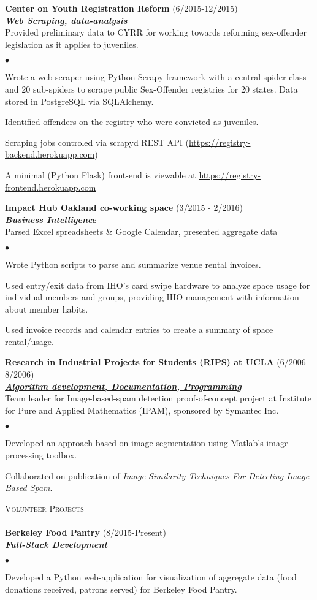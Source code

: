 \documentclass{article}
\newcommand{\lineunder}{\vspace*{-8pt} \\ \hspace*{-18pt} \hrulefill \\}
\newcommand{\header}[1]{{\hspace*{-15pt}\vspace*{6pt} \textsc{#1}} \vspace*{-6pt} \lineunder}
\newcommand{\employer}[3]{{ \textbf{#1} (#2)\\ \underline{\textbf{\emph{#3}}}\\  }}
\newenvironment{achievements}{\begin{list}{$\bullet$}{\topsep 0pt \itemsep -2pt}}{\vspace*{4pt}\end{list}}
\begin{document}
\employer{Center on Youth Registration Reform}{6/2015-12/2015}{Web Scraping, data-analysis}
 Provided preliminary data to CYRR for working towards reforming sex-offender legislation as it applies to juveniles.
\begin{achievements}
\item Wrote a web-scraper using Python Scrapy framework with a central spider class and 20 sub-spiders to scrape public Sex-Offender registries for 20 states.  Data stored in PostgreSQL via SQLAlchemy.
\item Identified offenders on the registry who were convicted as juveniles.
\item Scraping jobs controled via scrapyd REST API (\url{https://registry-backend.herokuapp.com}) 
\item A minimal (Python Flask) front-end is viewable at \url{https://registry-frontend.herokuapp.com}
\end{achievements}


\employer{Impact Hub Oakland co-working space}{3/2015 - 2/2016}{Business Intelligence}
Parsed Excel spreadsheets \& Google Calendar, presented aggregate data
\begin{achievements}
\item Wrote Python scripts to parse and summarize venue rental invoices.
\item Used entry/exit data from IHO's card swipe hardware to analyze space usage for individual members and groups, providing IHO management with information about member habits.
\item Used invoice records and calendar entries to create a summary of space rental/usage.
\end{achievements}



\employer{Research in Industrial Projects for Students (RIPS) at UCLA}{6/2006-8/2006}{Algorithm development, Documentation, Programming}
Team leader for Image-based-spam detection proof-of-concept project at  Institute for Pure and Applied Mathematics (IPAM), sponsored by Symantec Inc.
	\begin{achievements}
	\item Developed an approach based on image segmentation using Matlab's image processing toolbox.
	\item Collaborated on publication of \emph{Image Similarity Techniques For Detecting Image-Based Spam}.
\end{achievements}

\header{Volunteer Projects}
\employer{Berkeley Food Pantry}{8/2015-Present}{Full-Stack Development}
\begin{achievements}
\item Developed a Python web-application for visualization of aggregate data (food donations received, patrons served) for Berkeley Food Pantry. 
\end{achievements}
\end{document}
